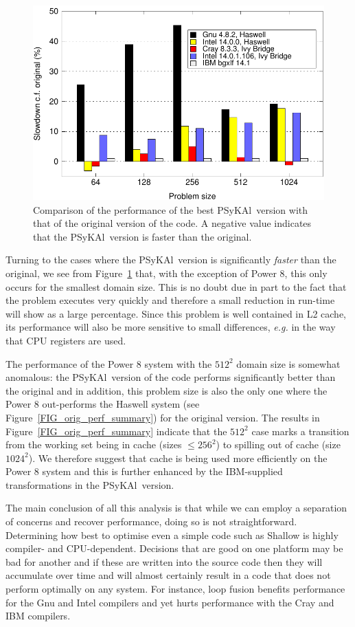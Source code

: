 \documentclass{IOS-Book-Article}
\newcommand{\psykal}{{PS}y{KA}l}
\begin{document}
\begin{figure}[!t]
\centering
\includegraphics[width=120mm]{slowdown_summary}
\caption{Comparison of the performance of the best \psykal\
version with that of the original version of the code. A negative value 
indicates that the \psykal\ version is faster than the original.}
\label{FIG_slowdown_summary}
\end{figure}

Turning to the cases where the \psykal\ version is significantly
{\em faster} than the original, we see from
Figure~\ref{FIG_slowdown_summary} that, with the exception of Power 8,
this only occurs for the smallest domain size. This is no doubt due in
part to the fact that the problem executes very quickly and therefore
a small reduction in run-time will show as a large percentage. Since
this problem is well contained in L2 cache, its performance will also
be more sensitive to small differences, {\it e.g.} in the way that CPU
registers are used. 

The performance of the Power 8 system with the $512^2$ domain size is
somewhat anomalous: the \psykal\ version of the code performs
significantly better than the original and in addition, this problem
size is also the only one where the Power 8 out-performs the Haswell
system (see Figure~\ref{FIG_orig_perf_summary}) for the original
version.  The results in Figure~\ref{FIG_orig_perf_summary} indicate
that the $512^2$ case marks a transition from the working set being in
cache (sizes $\leq 256^2$) to spilling out of cache (size $1024^2$). We
therefore suggest that cache is being used more efficiently on the
Power 8 system and this is further enhanced by the IBM-supplied
transformations in the \psykal\ version.

The main conclusion of all this analysis is that while we can employ a
separation of concerns and recover performance, doing so is not
straightforward. Determining how best to optimise even a simple code
such as Shallow is highly compiler- and CPU-dependent. Decisions that
are good on one platform may be bad for another and if these are
written into the source code then they will accumulate over time and
will almost certainly result in a code that does not perform optimally
on any system. For instance, loop fusion benefits performance for the
Gnu and Intel compilers and yet hurts performance with the Cray and
IBM compilers.
\end{document}
